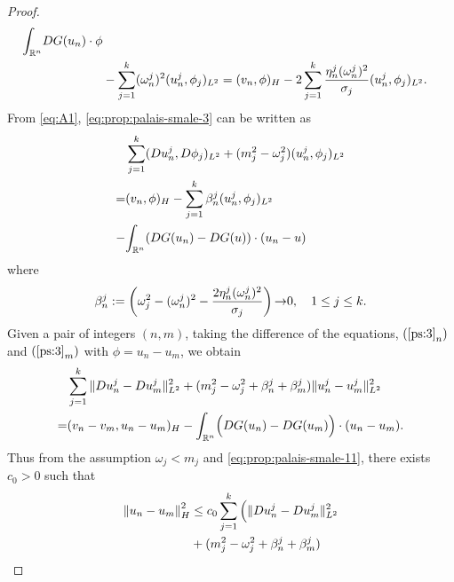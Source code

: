 \documentclass[a4paper,12pt,oneside]{amsart}
\theoremstyle{definition}
\theoremstyle{remark}
\theoremstyle{theorem}
\begin{document}
\begin{proof}
\begin{equation}
\begin{split}
{\int_{{\mathbb{R}}\sp{n}}} {D}{G}(u_n)\cdot\phi \\
&-  
\sum_{{j} = 1}\sp k ({\mathbf{\omega}}_n \sp{j})\sp 2 (u_n \sp{j},\phi_{j})_{L^2} = 
(v_n,\phi)_H - 2\sum_{{j} = 1}\sp k \frac{\eta_n \sp{j} ({\mathbf{\omega}}_n \sp{j})\sp 2}{{\sigma}_j} (u_n \sp{j} ,\phi_{j})_{L^2}.
\end{split}
\end{equation}
From \eqref{eq:A1}, \eqref{eq:prop:palais-smale-3} can
be written as
\begin{equation}
\label{ps:3} 
\begin{split}
&\sum_{j = 1}\sp k ({D} u_n\sp j,{D}\phi_j)_{L\sp 2} + 
(m_j \sp 2 - {\mathbf{\omega}}_j\sp 2)(u_n\sp j,\phi_j)_{L\sp 2}\\
=& 
(v_n,\phi)_H - 
\sum_{j = 1}\sp k \beta_n \sp j 
 (u_n\sp j,\phi_j)_{L\sp 2}\\
-& {\int_{{\mathbb{R}}\sp{n}}} ({D}{G}(u_n) - {D}{G}(u))\cdot(u_n - u)
\end{split}
\end{equation}
where
\begin{equation}
\label{eq:prop:palais-smale-11}
\beta_n\sp j := \left({\mathbf{\omega}}_j\sp 2 - ({\mathbf{\omega}}_n \sp j)\sp 2 - 
\frac{2 \eta_n \sp j ({\mathbf{\omega}}_n \sp j)\sp 2}{{\sigma}_j}\right){\rightarrow} 0,
\quad 1\leq j\leq k.
\end{equation}
Given a pair of integers $ (n,m) $, taking the difference of the equations, 
$ (\ref{ps:3}_n) $ and 
$ (\ref{ps:3}_m) $ with $ \phi = u_n - u_m $, we obtain
\begin{equation}
\label{eq:prop:palais-smale-5}
\begin{split}
&\sum_{{j} = 1}\sp k \|{D} u_n\sp j - {D} u_m\sp j\|_{L^2} ^2 + 
 (m_{j} ^2 - {\mathbf{\omega}}_{j} ^2 + \beta_n \sp j + \beta_m \sp j)
\|u_n \sp j - u_m\sp j\|_{L^2} ^2 \\
=& (v_n - v_m,u_n - u_m)_H - 
{\int_{{\mathbb{R}}\sp{n}}}\Big({D}{G}(u_n) - {D}{G}(u_m)\Big)\cdot (u_n - u_m).
\end{split}
\end{equation}
Thus from the assumption $ \omega_j < m_j $ and 
\eqref{eq:prop:palais-smale-11}, there exists $ c_0 > 0 $ such that
\begin{equation}
  \label{eq:prop:palais-smale-8}
\begin{split}
{\|{u_n - u_m}\|}_H \sp 2&\leq
c_0\sum_{{j} = 1}\sp k \Big(\|{D} u_n\sp j - {D} u_m\sp j\|_{L^2} ^2
\\
& +  
 (m_{j} ^2 - {\mathbf{\omega}}_{j} ^2 + \beta_n \sp j + \beta_m\sp j)

\end{split}
\end{equation}
\end{proof}
\end{document}
